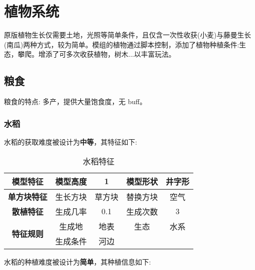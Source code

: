 \section{植物系统}

原版植物生长仅需要土地，光照等简单条件，且仅含一次性收获(小麦)与藤曼生长(南瓜)两种方式，较为简单。模组的植物通过脚本控制，添加了植物种植条件:生态，攀爬。增添了可多次收获植物，树木...以丰富玩法。

\subsection{粮食}

粮食的特点: 多产，提供大量饱食度，无 buff。

\subsubsection{水稻}

水稻的获取难度被设计为\textbf{中等}，其特征如下:
\begin{table}[H]
    \centering
    \caption{水稻特征}
    \label{table:水稻特征}
    \setlength{\tabcolsep}{4mm}
    \begin{tabular}{c|cc|cc}
        \toprule
        \textbf{模型特征}                  & 模型高度 & 1      & 模型形状 & 井字形 \\
        \midrule
        \textbf{单方块特征}                & 生长方块 & 草方块 & 替换方块 & 空气   \\
        \midrule
        \textbf{散植特征}                  & 生成几率 & 0.1    & 生成次数 & 3      \\
        \midrule
        \multirow{2}{*}{\textbf{特征规则}} & 生成地   & 地表   & 生态     & 水系   \\
                                           & 生成条件 & 河边                       \\
        \bottomrule
    \end{tabular}
\end{table}


水稻的种植难度被设计为\textbf{简单}，其种植信息如下:

